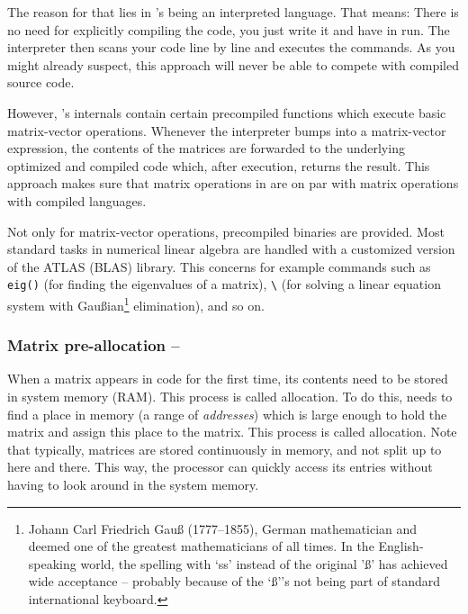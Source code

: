 The reason for that lies in \matlab{}'s being an interpreted language. That means: There is no need for explicitly compiling the code, you just write it and have in run. The \matlab{} interpreter then scans your code line by line and executes the commands. As you might already suspect, this approach will never be able to compete with compiled source code.

However, \matlab{}'s internals contain certain precompiled functions which execute basic matrix-vector operations. Whenever the \matlab{} interpreter bumps into a matrix-vector expression, the contents of the matrices are forwarded to the underlying optimized and compiled code which, after execution, returns the result. This approach makes sure that matrix operations in \matlab{} are on par with matrix operations with compiled languages.

\begin{remark}
Not only for matrix-vector operations, precompiled binaries are provided. Most standard tasks in numerical linear algebra are handled with a customized version of the ATLAS (BLAS) library. This concerns for example commands such as \lstinline!eig()! (for finding the eigenvalues of a matrix), \lstinline!\! (for solving a linear equation system with Gau{\ss}ian\footnote{Johann Carl Friedrich Gau{\ss} (1777--1855), German mathematician and deemed one of the greatest mathematicians of all times. In the English-speaking world, the spelling with `ss' instead of the original '\ss' has achieved wide acceptance -- probably because of the `\ss''s not being part of standard international keyboard.} elimination), and so on.
\end{remark}

\subsubsection{Matrix pre-allocation -- \fastsymbol\fastsymbol\fastsymbol\fastsymbol\fastsymbol}

When a matrix appears in \matlab{} code for the first time, its contents need to be stored in system memory (RAM). This process is called allocation. To do this, \matlab{} needs to find a place in memory (a range of \emph{addresses}) which is large enough to hold the matrix and assign this place to the matrix. This process is called allocation. Note that typically, matrices are stored continuously in memory, and not split up to here and there. This way, the processor can quickly access its entries without having to look around in the system memory.

